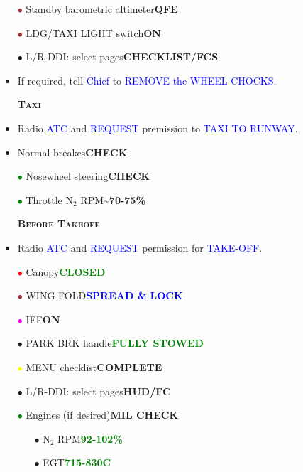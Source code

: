 \documentclass[a4paper,12pt,dvipsnames]{letter}
\newcommand{\radio}[1]{\textcolor{blue}{#1}}
\newcommand{\button}[1]{\textbf{#1}}
\newcommand{\degC}{\textdegree{}C}
\newcommand{\ok}[1]{\textcolor{Green}{\textbf{#1}}}
\newcommand{\boat}[1]{\textcolor{Blue}{\textbf{#1}}}
\newcommand{\myHead}[1]{{\LARGE\textsc{\textbf{#1}}}}
\newcommand{\bi}{\textcolor{ProcessBlue}{$\bullet$\;}}
\newcommand{\ri}{\textcolor{Red}{$\bullet$\;}}
\newcommand{\gi}{\textcolor{Green}{$\bullet$\;}}
\newcommand{\yi}{\textcolor{Yellow}{$\bullet$\;}}
\newcommand{\mi}{\textcolor{Magenta}{$\bullet$\;}}
\renewcommand{\ni}{\textcolor{Brown}{$\bullet$\;}}
\begin{document}
{\begin{itemize}
\begin{itemize}
  \item[\yi] R-DDI: FCS Page CH 1/3 of PROC row\dotfill\button{X}
 \end{itemize}  
 \item[\ni] Standby barometric altimeter\dotfill\button{QFE}
 \item[\ni] LDG/TAXI LIGHT switch\dotfill\button{ON}
 \item[\bi] L/R-DDI: select pages\dotfill\button{CHECKLIST/FCS}
 \item If required, tell \radio{Chief} to \radio{REMOVE the WHEEL CHOCKS}.
\end{itemize}
\newpage
\begin{itemize}
 \item[] \myHead{Taxi}
 \item Radio \radio{ATC} and \radio{REQUEST} premission to \radio{TAXI TO RUNWAY}.
 \item Normal breakes\dotfill\button{CHECK}
 \item[\gi] Nosewheel steering\dotfill\button{CHECK}
 \item[\gi] Throttle N$_2$ RPM\dotfill\button{\textasciitilde70-75\%}
\end{itemize}
\vspace{0.5em}
\begin{itemize}
 \item[] \myHead{Before Takeoff}
 \item Radio \radio{ATC} and \radio{REQUEST} permission for \radio{TAKE-OFF}.
 \item[\ri] Canopy\dotfill\ok{CLOSED}
 \item[\ni] WING FOLD\dotfill\boat{SPREAD \& LOCK}
 \item[\mi] IFF\dotfill\button{ON}
 \item[\bi] PARK BRK handle\dotfill\ok{FULLY STOWED}
 \item[\yi] MENU checklist\dotfill\button{COMPLETE}
 \item[\bi] L/R-DDI: select pages\dotfill\button{HUD/FC} 
 \item[\gi] Engines (if desired)\dotfill\button{MIL CHECK}
 \begin{itemize}
  \item[\bi] N$_2$ RPM\dotfill\ok{92-102\%}
  \item[\bi] EGT\dotfill\ok{715-830\degC}

\end{itemize}
\end{itemize}}
\end{document}
